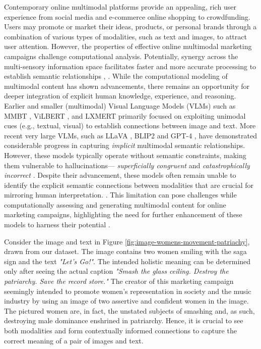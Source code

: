 Contemporary online multimodal platforms provide an appealing, rich user experience from social media and e-commerce online shopping to crowdfunding. Users may promote or market their ideas, products, or personal brands through a combination of various types of modalities, such as text and images, to attract user attention. However, the properties of effective online multimodal marketing campaigns challenge computational analysis. Potentially, synergy across the multi-sensory information space facilitates faster and more accurate processing to establish semantic relationships \cite{laurienti2004semantic,spence2011crossmodal,wickens2008multiple}, . While the computational modeling of multimodal content has shown advancements, there remains an opportunity for deeper integration of explicit human knowledge, experience, and reasoning. Earlier and smaller (multimodal) Visual Language Models (VLMs) such as MMBT \cite{kiela2020supervised}, ViLBERT \cite{lu2019vilbert}, and LXMERT \cite{tan2019lxmert} primarily focused on exploiting unimodal cues (e.g., textual, visual) to establish connections between image and text. More recent very large VLMs, such as LLaVA \cite{liu2023visual}, BLIP2 \cite{li2023blip} and GPT-4 \cite{openai2023gpt4}, have demonstrated considerable progress in capturing  \emph{implicit} multimodal semantic relationships. However, these models typically operate without semantic constraints, making them vulnerable to hallucinations--- \emph{superficially congruent} \cite{hasanyou,Meyer2022-cf} and  \emph{catastrophically incorrect} \cite{shuster2021retrieval,Maynez2020-cj}. Despite their advancement, these models often remain unable to identify the explicit semantic connections between modalities that are crucial for mirroring human interpretation. \cite{ji2020leveraging}. This limitation can pose challenges while computationally assessing and generating multimodal content for online marketing campaigns, highlighting the need for further enhancement of these models to harness their potential \cite{mcguffie2020radicalization,weidinger2022taxonomy,tamkin2021understanding,de2023chatgpt}. 

Consider the image and text in Figure \ref{fig:image-womens-movement-patriachy}, drawn from our dataset. 
The image contains two women smiling with the saga sign and the text \emph{"Let's Go!"}. The intended holistic meaning can be determined only after seeing the actual caption \emph{"Smash the glass ceiling. Destroy the patriarchy. Save the record store."} The creator of this marketing campaign seemingly intended to promote women's representation in society and the music industry by using an image of two assertive and confident women in the image. The pictured women are, in fact, the unstated subjects of smashing and, as such, destroying male dominance enshrined in patriarchy. Hence, it is crucial to see both modalities and form contextually informed connections to capture the correct meaning of a pair of images and text.

